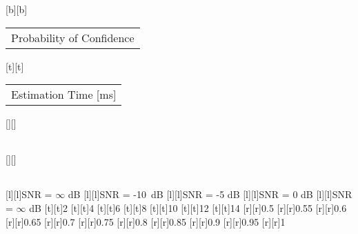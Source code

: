 %    
%
%
%
[b][b]{\fontsize{7.5}{11.25}\selectfont \color[rgb]{0,0,0}\setlength{\tabcolsep}{0pt}\begin{tabular}{c}Probability of Confidence\end{tabular}}%
[t][t]{\fontsize{7.5}{11.25}\selectfont \color[rgb]{0,0,0}\setlength{\tabcolsep}{0pt}\begin{tabular}{c}Estimation Time [ms]\end{tabular}}%
[][]{\fontsize{10}{15}\selectfont \color[rgb]{0,0,0}\setlength{\tabcolsep}{0pt}\begin{tabular}{c} \end{tabular}}%
[][]{\fontsize{10}{15}\selectfont \color[rgb]{0,0,0}\setlength{\tabcolsep}{0pt}\begin{tabular}{c} \end{tabular}}%
[l][l]{\fontsize{7.5}{11.25}\selectfont \color[rgb]{0,0,0}SNR = $\infty$ dB}%
[l][l]{\fontsize{7.5}{11.25}\selectfont \color[rgb]{0,0,0}SNR = -\SI{10}{dB}}%
[l][l]{\fontsize{7.5}{11.25}\selectfont \color[rgb]{0,0,0}SNR = -5 dB}%
[l][l]{\fontsize{7.5}{11.25}\selectfont \color[rgb]{0,0,0}SNR = 0 dB}%
[l][l]{\fontsize{7.5}{11.25}\selectfont \color[rgb]{0,0,0}SNR = $\infty$ dB}%
%
\fontsize{7.5}{11.25}%
\selectfont%
%
[t][t]{2}%
[t][t]{4}%
[t][t]{6}%
[t][t]{8}%
[t][t]{10}%
[t][t]{12}%
[t][t]{14}%
%
[r][r]{0.5}%
[r][r]{0.55}%
[r][r]{0.6}%
[r][r]{0.65}%
[r][r]{0.7}%
[r][r]{0.75}%
[r][r]{0.8}%
[r][r]{0.85}%
[r][r]{0.9}%
[r][r]{0.95}%
[r][r]{1}%
%
%
